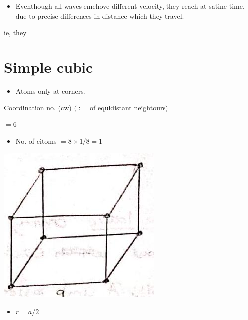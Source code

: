 \documentclass[10pt]{article}
\begin{document}
\begin{itemize}
  \item Eventhough all waves emehove different velocity, they reach at satine time, due to precise differences in distance which they travel.
\end{itemize}

ie, they

\section*{Simple cubic}
\begin{itemize}
  \item Atoms only at corners.
\end{itemize}

Coordination no. (cw) $(:=$ of equidistant neightours)

$=6$

\begin{itemize}
  \item No. of citoms $=8 \times 1 / 8=1$
\end{itemize}

\begin{center}
\includegraphics[max width=\textwidth]{2024_06_16_30d750483617f1939202g-07}
\end{center}

\begin{itemize}
  \item $r=a / 2$
\end{itemize}
\end{document}
